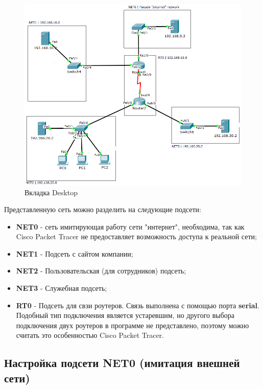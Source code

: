\documentclass[14pt,a4paper,report]{report}
\begin{document}
\begin{figure}[h]
  \centering
  \includegraphics[width=.8\textwidth]{img/scheme}
  \caption{Вкладка Desktop}
\end{figure}
Представленную сеть можно разделить на следующие подсети:
\begin{itemize}
\item \textbf{NET0} - сеть имитирующая работу сети "интернет", необходима, так как Cisco Packet Tracer не предоставляет возможность доступа к реальной сети;
\item \textbf{NET1} - Подсеть с сайтом компании;
\item \textbf{NET2} - Пользовательская (для сотрудников) подсеть;
\item \textbf{NET3} - Служебная подсеть;
\item \textbf{RT0} - Подсеть для свзи роутеров. Связь выполнена с помощью порта \textbf{serial}. Подобный тип подключения является устаревшим, но другого выбора подключения двух роутеров в программе не представлено, поэтому можно считать это особенностью Cisco Packet Tracer.
\end{itemize}
\clearpage

\subsection{Настройка подсети NET0 (имитация внешней сети)}
\end{document}
